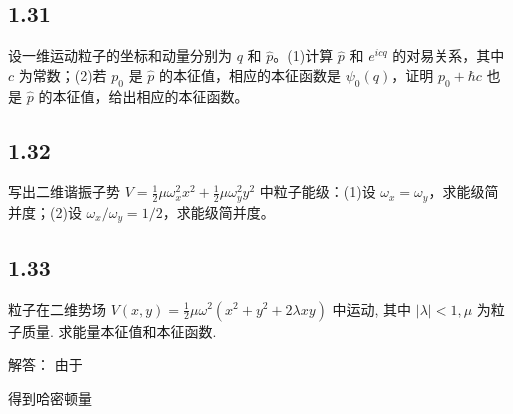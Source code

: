 \subsection{1.31}
设一维运动粒子的坐标和动量分别为 $q$ 和 $\hat{p}$。(1)计算 $\hat{p}$ 和 $e^{icq}$ 的对易关系，其中 $c$ 为常数；(2)若 $p_0$ 是 $\hat{p}$ 的本征值，相应的本征函数是 $\psi_0(q)$，证明 $p_0 + \hbar c$ 也是 $\hat{p}$ 的本征值，给出相应的本征函数。

\subsection{1.32}
写出二维谐振子势 $V = \frac{1}{2} \mu \omega_x^2 x^2 + \frac{1}{2} \mu \omega_y^2 y^2$ 中粒子能级：(1)设 $\omega_x = \omega_y$，求能级简并度；(2)设 $\omega_x / \omega_y = 1/2$，求能级简并度。

\subsection{1.33}
粒子在二维势场 $V(x, y) = \frac{1}{2} \mu \omega^2 (x^2 + y^2 + 2 \lambda xy)$ 中运动, 其中 $|\lambda| < 1,  \mu$ 为粒子质量. 求能量本征值和本征函数.

解答：
由于

得到哈密顿量


